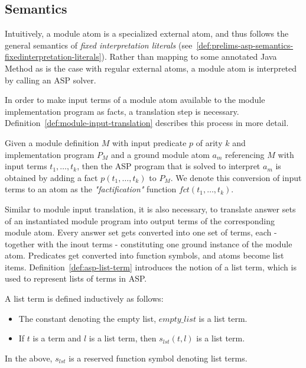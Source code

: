 \subsection{Semantics}
\label{subsec:evolog-modules-semantics}

Intuitively, a module atom is a specialized external atom, and thus follows the general semantics of \emph{fixed interpretation literals} (see~\ref{def:prelims-asp-semantics-fixedinterpretation-literals}). Rather than mapping to some annotated Java Method as is the case with regular external atoms, a module atom is interpreted by calling an ASP solver.

In order to make input terms of a module atom available to the module implementation program as facts, a translation step is necessary. Definition~\ref{def:module-input-translation} describes this process in more detail.

\begin{definition}
\label{def:module-input-translation}
Given a module definition $M$ with input predicate $p$ of arity $k$ and implementation program $P_M$ and a ground module atom $a_m$ referencing $M$ with input terms $t_1,\ldots,t_k$, then the ASP program that is solved to interpret $a_m$ is obtained by adding a fact $p(t_1,\ldots,t_k)$ to $P_M$. We denote this conversion of input terms to an atom as the \emph{"factification"} function $\mathit{fct(t_1,\ldots,t_k)}$.
\end{definition}	

Similar to module input translation, it is also necessary, to translate answer sets of an instantiated module program into output terms of the corresponding module atom. Every answer set gets converted into one set of terms, each - together with the inout terms - constituting one ground instance of the module atom. Predicates get converted into function symbols, and atoms become list items. Definition~\ref{def:asp-list-term} introduces the notion of a list term, which is used to represent lists of terms in ASP.

\begin{definition}
\label{def:asp-list-term}
A list term is defined inductively as follows:
\begin{itemize}
		\item The constant denoting the empty list, $\mathit{empty\_list}$ is a list term.
		\item If $t$ is a term and $l$ is a list term, then $s_{lst}(t, l)$ is a list term.
\end{itemize}	
In the above, $s_{lst}$ is a reserved function symbol denoting list terms.
\end{definition}	

